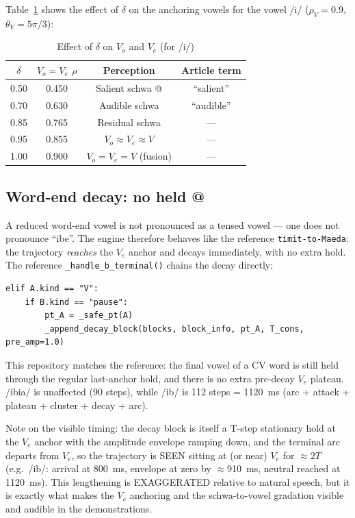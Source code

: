 \documentclass[11pt,a4paper]{article}
\begin{document}
Table~\ref{tab:delta} shows the effect of $\delta$ on the anchoring
vowels for the vowel /i/ ($\rho_V = 0.9$, $\theta_V = 5\pi/3$):

\begin{table}[h]
\centering
\caption{Effect of $\delta$ on $V_o$ and $V_e$ (for /i/)}
\label{tab:delta}
\begin{tabular}{cccc}
\toprule
$\delta$ & $V_o = V_e$ $\rho$ & Perception & Article term \\
\midrule
0.50 & 0.450 & Salient schwa @ & ``salient'' \\
0.70 & 0.630 & Audible schwa   & ``audible'' \\
0.85 & 0.765 & Residual schwa  & --- \\
0.95 & 0.855 & $V_o \approx V_e \approx V$ & --- \\
1.00 & 0.900 & $V_o = V_e = V$ (fusion) & --- \\
\bottomrule
\end{tabular}
\end{table}

\subsection{Word-end decay: no held @}

A reduced word-end vowel is not pronounced as a tensed vowel --- one
does not pronounce ``ibe''. The engine therefore behaves like the
reference \texttt{timit-to-Maeda}: the trajectory \emph{reaches} the
$V_e$ anchor and decays immediately, with no extra hold. The
reference \texttt{\_handle\_b\_terminal()} chains the decay directly:

\begin{lstlisting}
elif A.kind == "V":
    if B.kind == "pause":
        pt_A = _safe_pt(A)
        _append_decay_block(blocks, block_info, pt_A, T_cons, pre_amp=1.0)
\end{lstlisting}

This repository matches the reference: the final vowel of a CV word
is still held through the regular last-anchor hold, and there is no
extra pre-decay $V_e$ plateau. /ibia/ is unaffected (90 steps), while
/ib/ is 112 steps = 1120~ms (arc + attack + plateau + cluster + decay
+ arc).

Note on the visible timing: the decay block is itself a T-step
stationary hold at the $V_e$ anchor with the amplitude envelope
ramping down, and the terminal arc departs from $V_e$, so the
trajectory is SEEN sitting at (or near) $V_e$ for $\approx 2T$
(e.g.\ /ib/: arrival at 800~ms, envelope at zero by $\approx$910~ms,
neutral reached at 1120~ms). This lengthening is EXAGGERATED relative
to natural speech, but it is exactly what makes the $V_e$ anchoring
and the schwa-to-vowel gradation visible and audible in the
demonstrations.
\end{document}
